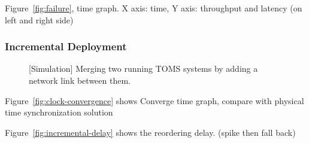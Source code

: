 Figure~\ref{fig:failure}, time graph. X axis: time, Y axis: throughput and latency (on left and right side)
\fi

\subsubsection{Incremental Deployment}
\label{sec:eval-incremental}


\begin{figure}[t]
\centering
	\hspace{0.01\textwidth}
\caption{[Simulation] Merging two running TOMS systems by adding a network link between them.}
\label{fig:incremental}
\end{figure}

Figure~\ref{fig:clock-convergence} shows
Converge time graph, compare with physical time synchronization solution

Figure~\ref{fig:incremental-delay} shows the reordering delay. (spike then fall back)




